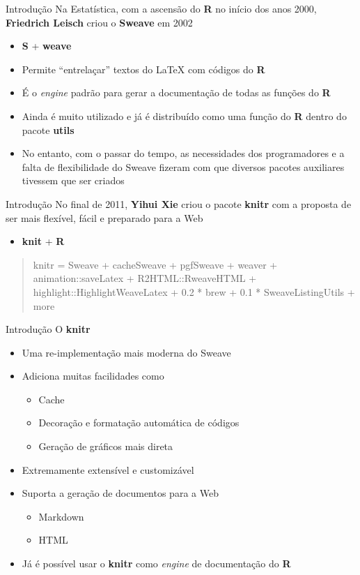 \documentclass{beamer}\usepackage[]{graphicx}\usepackage[]{color}
\providecommand{\R}{\textbf{R}\xspace}
\providecommand{\knitr}{\textbf{knitr}\xspace}
\begin{document}
\begin{frame}{Introdução}
  Na Estatística, com a ascensão do \R no início dos anos 2000,
  \textbf{Friedrich Leisch} criou o \textbf{Sweave} em 2002
  \begin{itemize}
  \item \textbf{S} + \textbf{weave}
  \item Permite ``entrelaçar'' textos do \LaTeX{} com códigos do \R
  \item É o \textit{engine} padrão para gerar a documentação de todas as
    funções do \R
  \item Ainda é muito utilizado e já é distribuído como uma função do \R
    dentro do pacote \textbf{utils}
  \item No entanto, com o passar do tempo, as necessidades dos
    programadores e a falta de flexibilidade do Sweave fizeram com que
    diversos pacotes auxiliares tivessem que ser criados
  \end{itemize}
\end{frame}

\begin{frame}{Introdução}
  No final de 2011, \textbf{Yihui Xie} criou o pacote \textbf{knitr} com
  a proposta de ser mais flexível, fácil e preparado para a Web
  \begin{itemize}
  \item \textbf{knit} + \R
  \end{itemize}
  \begin{quote}
    knitr = Sweave + cacheSweave + pgfSweave + weaver +
    animation::saveLatex + R2HTML::RweaveHTML +
    highlight::HighlightWeaveLatex + 0.2 * brew + 0.1 *
    SweaveListingUtils + more
  \end{quote}
\end{frame}

\begin{frame}{Introdução}
O \textbf{knitr}
\begin{itemize}
\item Uma re-implementação mais moderna do Sweave
\item Adiciona muitas facilidades como
  \begin{itemize}
  \item Cache
  \item Decoração e formatação automática de códigos
  \item Geração de gráficos mais direta
  \end{itemize}
\item Extremamente extensível e customizável
\item Suporta a geração de documentos para a Web
  \begin{itemize}
  \item Markdown
  \item HTML
  \end{itemize}
\item Já é possível usar o \knitr como \textit{engine} de documentação
  do \R
\end{itemize}
\end{frame}
\end{document}
